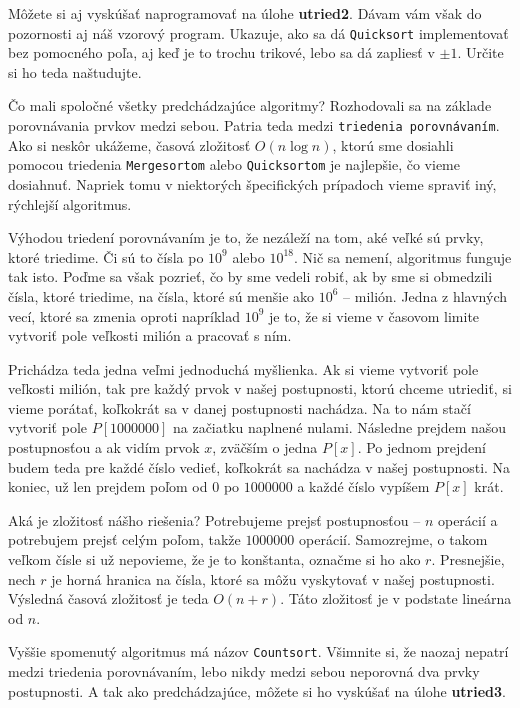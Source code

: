 Môžete si aj vyskúšať naprogramovať na úlohe \textbf{utried2}. Dávam vám však do pozornosti aj náš
vzorový program. Ukazuje, ako sa dá \texttt{Quicksort} implementovať bez pomocného poľa, aj keď je
to trochu trikové, lebo sa dá zapliesť v $\pm 1$. Určite si ho teda naštudujte.


Čo mali spoločné všetky predchádzajúce algoritmy? Rozhodovali sa na základe porovnávania prvkov
medzi sebou. Patria teda medzi \texttt{triedenia porovnávaním}. Ako si neskôr ukážeme, časová
zložitosť $O(n \log n)$, ktorú sme dosiahli pomocou triedenia \texttt{Mergesortom} alebo \texttt{Quicksortom}
je najlepšie, čo vieme dosiahnuť. Napriek tomu v niektorých špecifických prípadoch vieme spraviť
iný, rýchlejší algoritmus.

Výhodou triedení porovnávaním je to, že nezáleží na tom, aké veľké sú prvky, ktoré triedime. Či sú to čísla
po $10^9$ alebo $10^{18}$. Nič sa nemení, algoritmus funguje tak isto. Poďme sa však pozrieť, čo by
sme vedeli robiť, ak by sme si obmedzili čísla, ktoré triedime, na čísla, ktoré sú menšie ako $10^6$ -- milión. Jedna z
hlavných vecí, ktoré sa zmenia oproti napríklad $10^9$ je to, že si vieme v časovom limite vytvoriť
pole veľkosti milión a pracovať s ním.

Prichádza teda jedna veľmi jednoduchá myšlienka. Ak si vieme vytvoriť pole veľkosti milión, tak pre
každý prvok v našej postupnosti, ktorú chceme utriediť, si vieme porátať, koľkokrát sa v danej
postupnosti nachádza. Na to nám stačí vytvoriť pole $P[1000000]$ na začiatku naplnené nulami.
Následne prejdem našou postupnosťou a ak vidím prvok $x$, zväčším o jedna $P[x]$. Po jednom
prejdení budem teda pre každé číslo vedieť, koľkokrát sa nachádza v našej postupnosti. Na koniec,
už len prejdem poľom od $0$ po $1000000$ a každé číslo vypíšem $P[x]$ krát.

Aká je zložitosť nášho riešenia? Potrebujeme prejsť postupnosťou -- $n$ operácií a potrebujem
prejsť celým poľom, takže $1000000$ operácií. Samozrejme, o takom veľkom čísle si už nepovieme, že
je to konštanta, označme si ho ako $r$. Presnejšie, nech $r$ je horná hranica na čísla, ktoré sa
môžu vyskytovať v našej postupnosti. Výsledná časová zložitosť je teda $O(n+r)$. Táto zložitosť je
v podstate lineárna od $n$.

Vyššie spomenutý algoritmus má názov \texttt{Countsort}. Všimnite si, že naozaj nepatrí medzi
triedenia porovnávaním, lebo nikdy medzi sebou neporovná dva prvky postupnosti. A tak ako
predchádzajúce, môžete si ho vyskúšať na úlohe \textbf{utried3}.

